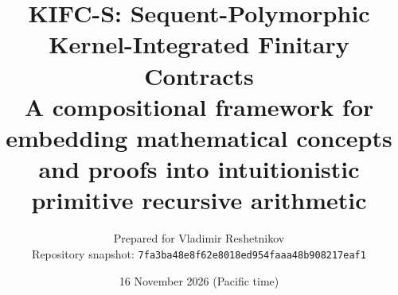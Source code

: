 \documentclass[11pt,oneside]{article}
\title{\textbf{KIFC-S: Sequent-Polymorphic Kernel-Integrated Finitary Contracts}\\[0.4em]
\large A compositional framework for embedding mathematical concepts and proofs into intuitionistic primitive recursive arithmetic}
\author{Prepared for Vladimir Reshetnikov\\Repository snapshot: \texttt{7fa3ba48e8f62e8018ed954faaa48b908217eaf1}}
\date{16 November 2026 (Pacific time)}
\begin{document}
\maketitle
\begin{abstract}

\end{abstract}
\tableofcontents
\newpage




















\appendix



\end{document}
